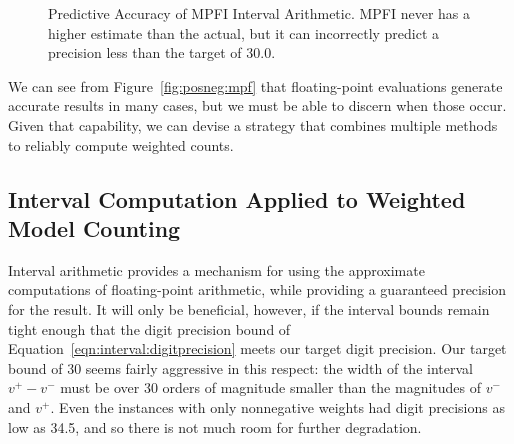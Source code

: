 \documentclass[letterpaper,USenglish,cleveref, autoref, thm-restate]{lipics-v2021}
\newcommand{\vmin}{v^{-}}
\newcommand{\vmax}{v^{+}}
\begin{document}
\begin{figure}
\caption{Predictive Accuracy of MPFI Interval Arithmetic.  MPFI never has a higher estimate than the actual, but it can
incorrectly predict a precision less than the target of 30.0.}
\label{fig:mpfi}
\end{figure}


We can see from Figure~\ref{fig:posneg:mpf} that floating-point
evaluations generate accurate results in many cases, but we must be
able to discern when those occur.  Given that capability, we can
devise a strategy that combines multiple methods
to reliably compute weighted counts.

\subsection{Interval Computation Applied to Weighted Model Counting}

Interval arithmetic provides a mechanism for using the approximate
computations of floating-point arithmetic, while providing a
guaranteed precision for the result.  It will only be beneficial,
however, if the interval bounds remain tight enough that the digit
precision bound of Equation~\ref{eqn:interval:digitprecision} meets
our target digit precision.  Our target bound of 30 seems fairly
aggressive in this respect: the width of the interval $\vmax-\vmin$
must be over 30 orders of magnitude smaller than the magnitudes of
$\vmin$ and $\vmax$.  Even the instances with only nonnegative weights
had digit precisions as low as 34.5, and so there is not much
room for further degradation.
\end{document}
